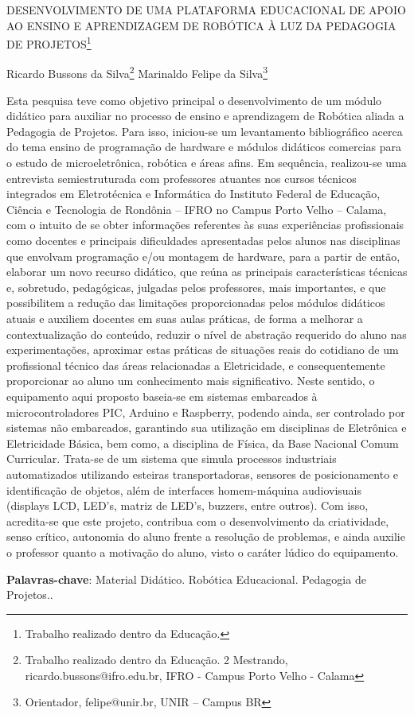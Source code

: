 \documentclass[article,12pt,onesidea,4paper,english,brazil]{abntex2}
\begin{document}
	
	
	\frenchspacing 
	
	\begin{center}
		\LARGE DESENVOLVIMENTO DE UMA PLATAFORMA EDUCACIONAL DE APOIO AO ENSINO E APRENDIZAGEM DE ROBÓTICA À LUZ DA PEDAGOGIA DE PROJETOS\footnote{Trabalho realizado dentro da Educação.}
		
		\normalsize
		Ricardo Bussons da Silva\footnote{Trabalho realizado dentro da Educação. 2 Mestrando, ricardo.bussons@ifro.edu.br, IFRO - Campus Porto Velho - Calama} 
		Marinaldo Felipe da Silva\footnote{Orientador, felipe@unir.br, UNIR – Campus BR}  
	\end{center}
	
	\noindent Esta pesquisa teve como objetivo principal o desenvolvimento de um módulo
	didático para auxiliar no processo de ensino e aprendizagem de Robótica aliada a
	Pedagogia de Projetos. Para isso, iniciou-se um levantamento bibliográfico acerca
	do tema ensino de programação de hardware e módulos didáticos comercias para o
	estudo de microeletrônica, robótica e áreas afins. Em sequência, realizou-se uma
	entrevista semiestruturada com professores atuantes nos cursos técnicos integrados
	em Eletrotécnica e Informática do Instituto Federal de Educação, Ciência e
	Tecnologia de Rondônia – IFRO no Campus Porto Velho – Calama, com o intuito de
	se obter informações referentes às suas experiências profissionais como docentes e
	principais dificuldades apresentadas pelos alunos nas disciplinas que envolvam
	programação e/ou montagem de hardware, para a partir de então, elaborar um novo
	recurso didático, que reúna as principais características técnicas e, sobretudo,
	pedagógicas, julgadas pelos professores, mais importantes, e que possibilitem a
	redução das limitações proporcionadas pelos módulos didáticos atuais e auxiliem
	docentes em suas aulas práticas, de forma a melhorar a contextualização do
	conteúdo, reduzir o nível de abstração requerido do aluno nas experimentações,
	aproximar estas práticas de situações reais do cotidiano de um profissional técnico
	das áreas relacionadas a Eletricidade, e consequentemente proporcionar ao aluno
	um conhecimento mais significativo. Neste sentido, o equipamento aqui proposto
	baseia-se em sistemas embarcados à microcontroladores PIC, Arduino e Raspberry,
	podendo ainda, ser controlado por sistemas não embarcados, garantindo sua
	utilização em disciplinas de Eletrônica e Eletricidade Básica, bem como, a disciplina
	de Física, da Base Nacional Comum Curricular. Trata-se de um sistema que simula
	processos industriais automatizados utilizando esteiras transportadoras, sensores de
	posicionamento e identificação de objetos, além de interfaces homem-máquina
	audiovisuais (displays LCD, LED’s, matriz de LED’s, buzzers, entre outros). Com
	isso, acredita-se que este projeto, contribua com o desenvolvimento da criatividade,
	senso crítico, autonomia do aluno frente a resolução de problemas, e ainda auxilie o
	professor quanto a motivação do aluno, visto o caráter lúdico do equipamento.
	
	\vspace{\onelineskip}
	
	\noindent
	\textbf{Palavras-chave}: Material Didático. Robótica Educacional. Pedagogia de Projetos..
	
\end{document}
